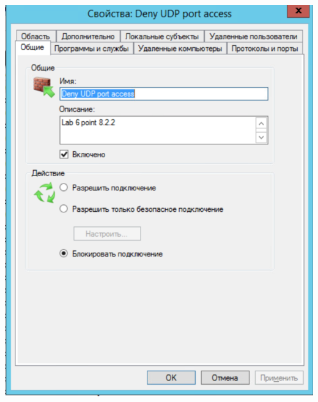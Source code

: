 \documentclass[a4paper,14pt]{extarticle}
\begin{document}
    \begin{center}
        \includegraphics[scale=0.7]{8.4.1.png}
    \end{center}
\end{document}
